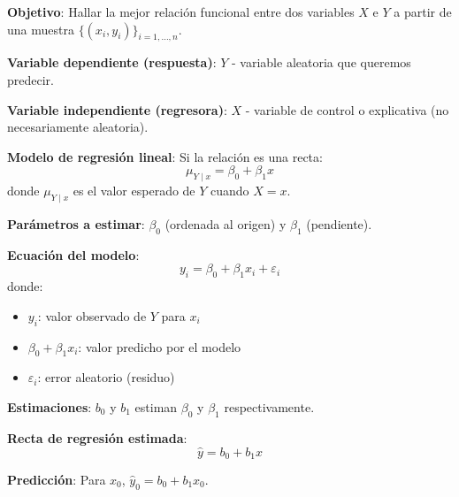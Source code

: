 \documentclass[10pt,a4paper]{article}
\begin{document}

\begin{tcolorbox}[title=Introducción]
    \textbf{Objetivo}: Hallar la mejor relación funcional entre dos variables $X$ e $Y$ a partir de una muestra $\{(x_i, y_i)\}_{i=1,\ldots,n}$.
    
    \textbf{Variable dependiente (respuesta)}: $Y$ - variable aleatoria que queremos predecir.
    
    \textbf{Variable independiente (regresora)}: $X$ - variable de control o explicativa (no necesariamente aleatoria).
    
    \textbf{Modelo de regresión lineal}: Si la relación es una recta:
    \[
        \mu_{Y \mid x} = \beta_0 + \beta_1 x
    \]
    donde $\mu_{Y \mid x}$ es el valor esperado de $Y$ cuando $X = x$.
    
    \textbf{Parámetros a estimar}: $\beta_0$ (ordenada al origen) y $\beta_1$ (pendiente).
\end{tcolorbox}

\begin{tcolorbox}[title=Modelo de Regresión Lineal]
    \textbf{Ecuación del modelo}:
    \[
        y_i = \beta_0 + \beta_1 x_i + \varepsilon_i
    \]
    donde:
    \begin{itemize}
        \item $y_i$: valor observado de $Y$ para $x_i$
        \item $\beta_0 + \beta_1 x_i$: valor predicho por el modelo
        \item $\varepsilon_i$: error aleatorio (residuo)
    \end{itemize}
    
    \textbf{Estimaciones}: $b_0$ y $b_1$ estiman $\beta_0$ y $\beta_1$ respectivamente.
    
    \textbf{Recta de regresión estimada}:
    \[
        \hat{y} = b_0 + b_1 x
    \]
    
    \textbf{Predicción}: Para $x_0$, $\hat{y}_0 = b_0 + b_1 x_0$.
\end{tcolorbox}

\end{document}
